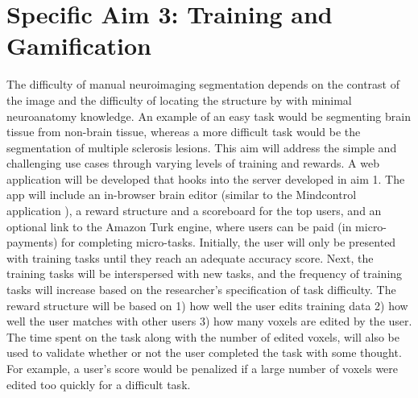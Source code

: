 

\section{Specific Aim 3: Training and Gamification}

The difficulty of manual neuroimaging segmentation depends on the contrast of the image and the difficulty of locating the structure by with minimal neuroanatomy knowledge. An example of an easy task would be segmenting brain tissue from non-brain tissue, whereas a more difficult task would be the segmentation of multiple sclerosis lesions. This aim will address the simple and challenging use cases through varying levels of training and rewards. A web application will be developed that hooks into the server developed in aim 1. The app will include an in-browser brain editor (similar to the Mindcontrol application \cite{keshavan2016mindcontrol}), a reward structure and a scoreboard for the top users, and an optional link to the Amazon Turk engine, where users can be paid (in micro-payments) for completing micro-tasks. Initially, the user will only be presented with training tasks until they reach an adequate accuracy score. Next, the training tasks will be interspersed with new tasks, and the frequency of training tasks will increase based on the researcher's specification of task difficulty. The reward structure will be based on 1) how well the user edits training data 2) how well the user matches with other users 3) how many voxels are edited by the user. The time spent on the task along with the number of edited voxels, will also be used to validate whether or not the user completed the task with some thought. For example, a user's score would be penalized if a large number of voxels were edited too quickly for a difficult task. 